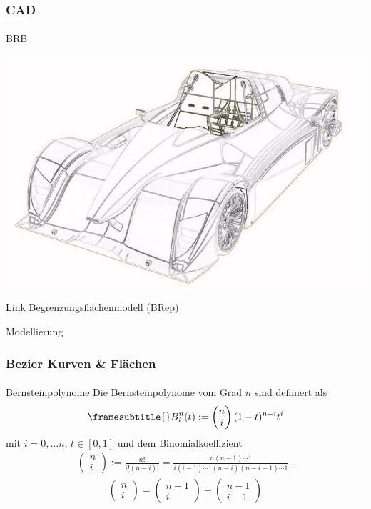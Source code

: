 \documentclass{beamer}
\begin{document}
\begin{frame}
    \frametitle{CAD}
\framesubtitle{}
    \begin{block}{BRB}
\begin{center}
\includegraphics[scale=0.85]{images/brb}
\end{center}
\end{block}

\begin{block}{Link}
\href{https://de.wikipedia.org/wiki/Boundary_Representation}{Begrenzungsflächenmodell (BRep)}
\end{block}

\end{frame}






\begin{frame}{Modellierung}
\frametitle{Bezier Kurven & Flächen}
\framesubtitle{}
 \begin{block}{Bernsteinpolynome}
Die Bernsteinpolynome vom Grad $n$ sind definiert als
\begin{align*}
\framesubtitle{}
B_i^n(t) := \begin{pmatrix} n \\ i \end{pmatrix} (1-t)^{n-i}t^i
\end{align*}
mit $i = 0, \hdots n$, $t \in [0,1]$ und dem Binomialkoeffizient
\begin{align*}
\begin{pmatrix} n \\ i \end{pmatrix} := \frac{n!}{i!(n-i)!} = \frac{n(n-1) \cdots 1}{i(i-1) \cdots 1 (n-i) (n-i-1) \cdots 1 } \; .
\end{align*}
\begin{align*}
\begin{pmatrix} n \\ i \end{pmatrix} = \begin{pmatrix} n-1 \\ i \end{pmatrix} + \begin{pmatrix} n-1 \\ i-1 \end{pmatrix} 
\end{align*}
\end{block}

\end{frame}
\end{document}
